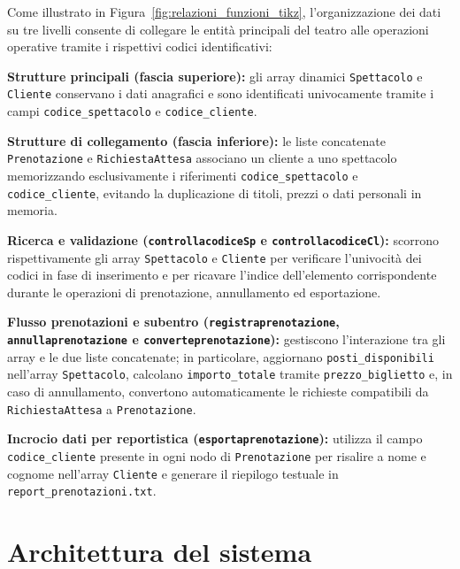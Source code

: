 \documentclass[11pt,a4paper,oneside,openany]{book}
\newenvironment{listacomp}{%
    \small
    \begin{list}{\textendash}{%
        \setlength{\topsep}{2pt}%
        \setlength{\partopsep}{0pt}%
        \setlength{\itemsep}{1pt}%
        \setlength{\parsep}{0pt}%
        \setlength{\leftmargin}{1.2em}%
    }%
}{%
    \end{list}%
}
\begin{document}
Come illustrato in Figura~\ref{fig:relazioni_funzioni_tikz}, l'organizzazione dei dati su tre livelli consente di collegare le entità principali del teatro alle operazioni operative tramite i rispettivi codici identificativi:
\begin{listacomp}
    \item \textbf{Strutture principali (fascia superiore):} gli array dinamici \texttt{Spettacolo} e \texttt{Cliente} conservano i dati anagrafici e sono identificati univocamente tramite i campi \texttt{codice\_spettacolo} e \texttt{codice\_cliente}.
    \item \textbf{Strutture di collegamento (fascia inferiore):} le liste concatenate \texttt{Prenotazione} e \texttt{RichiestaAttesa} associano un cliente a uno spettacolo memorizzando esclusivamente i riferimenti \texttt{codice\_spettacolo} e \texttt{codice\_cliente}, evitando la duplicazione di titoli, prezzi o dati personali in memoria.
    \item \textbf{Ricerca e validazione (\texttt{controllacodiceSp} e \texttt{controllacodiceCl}):} scorrono rispettivamente gli array \texttt{Spettacolo} e \texttt{Cliente} per verificare l'univocità dei codici in fase di inserimento e per ricavare l'indice dell'elemento corrispondente durante le operazioni di prenotazione, annullamento ed esportazione.
    \item \textbf{Flusso prenotazioni e subentro (\texttt{registraprenotazione}, \texttt{annullaprenotazione} e \texttt{converteprenotazione}):} gestiscono l'interazione tra gli array e le due liste concatenate; in particolare, aggiornano \texttt{posti\_disponibili} nell'array \texttt{Spettacolo}, calcolano \texttt{importo\_totale} tramite \texttt{prezzo\_biglietto} e, in caso di annullamento, convertono automaticamente le richieste compatibili da \texttt{RichiestaAttesa} a \texttt{Prenotazione}.
    \item \textbf{Incrocio dati per reportistica (\texttt{esportaprenotazione}):} utilizza il campo \texttt{codice\_cliente} presente in ogni nodo di \texttt{Prenotazione} per risalire a nome e cognome nell'array \texttt{Cliente} e generare il riepilogo testuale in \texttt{report\_prenotazioni.txt}.
\end{listacomp}

\section{Architettura del sistema}
\end{document}
